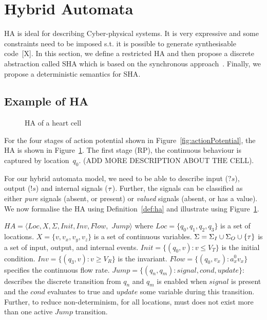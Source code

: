 \section{Hybrid Automata}
\label{sec:HA}



\acf{HA} is ideal for describing 
Cyber-physical systems. It is very expressive and
some constraints need to be imposed s.t. it is possible to  
generate synthesisable  code~[X]. In this section, 
we define a restricted \ac{HA} and then propose a discrete abstraction
called \acf{SHA} which is based on the
synchronous approach~\cite{benveniste03}.
Finally, we propose a deterministic semantics for \ac{SHA}.



\subsection{Example of \acf{HA} }

\begin{figure}
\centering

\caption{\acf{HA} of a heart cell \label{fig:heartCellHA}}
\end{figure}


For the four stages of action potential  shown in Figure~\ref{fig:actionPotential}, the \ac{HA} is
shown in Figure~\ref{fig:heartCellHA}.
The first stage (\ac{RP}), the continuous behaviour is captured 
by location~$q_0$. (ADD MORE DESCRIPTION ABOUT THE CELL).

For our hybrid automata model, we need to be able to 
describe  input ($?s$), output ($!s$) and internal signals ($\tau$). 
Further,
the signals can be classified as either 
\emph{pure} signals (absent, or present) or
\emph{valued} signals (absent, or has a value).
We now formalise
the \ac{HA} using Definition~\ref{def:ha} 
and illustrate using Figure~\ref{fig:heartCellHA}.\newline



\begin{definition}
	\label{def:ha}
	 $HA = \langle Loc, X, \Sigma, Init, Inv, Flow,$ $ Jump \rangle$ where
	$Loc=\{q_0,q_1,q_2,q_3\}$ is a set of locations.
	$X=\{v,v_x,v_y,v_z\}$ is a set of continuous variables.
	$\Sigma=\Sigma_I \cup \Sigma_O \cup \{\tau\}$ is a set of
	 input, output, and internal events.
	$Init=\{(q_0,v): v\leq V_T\}$ is the initial condition.
	$Inv=\{(q_3,v): v\geq V_R\}$ is the invariant.
	$Flow=\{(q_0,v_x): a_{x}^{0} v_x\}$ specifies the continuous flow rate.
	$Jump=\{(q_n, q_m): signal, cond, update\}$: describes the discrete
	transition from $q_n$ and $q_m$ is enabled when $signal$ is 
	present and the $cond$ evaluates to true and $update$
	some variable during this transition.
	Further, to reduce non-determinism, 
	for all locations, must does not exist more than one 
	active $Jump$ transition.
\end{definition}


